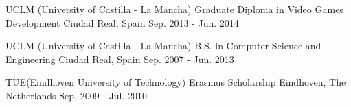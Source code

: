 

\begin{cventries}

  \cveduentry
    {UCLM (University of Castilla - La Mancha)} %
    {Graduate Diploma in Video Games Development} %
    {Ciudad Real, Spain} %
    {Sep. 2013 - Jun. 2014} %
    {}

  \cveduentry
    {UCLM (University of Castilla - La Mancha)} %
    {B.S. in Computer Science and Engineering} %
    {Ciudad Real, Spain} %
    {Sep. 2007 - Jun. 2013} %
   {}


  \cveduentry
    {TUE(Eindhoven University of Technology)} %
    {Erasmus Scholarship} %
    {Eindhoven, The Netherlands} %
    {Sep. 2009 - Jul. 2010} %
    {}

\end{cventries}
